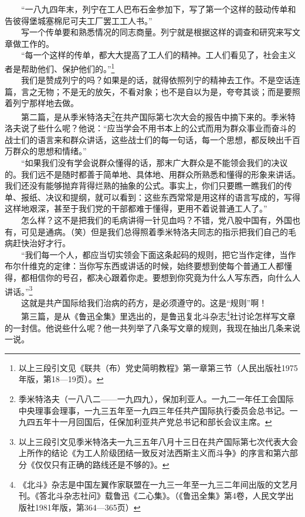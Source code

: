\documentclass[cn,11pt,chinese]{elegantbook}
\begin{document}
　　“一八九四年末，列宁在工人巴布石金参加下，写了第一个这样的鼓动传单和告彼得堡城塞棉尼可夫工厂罢工工人书。”\\
　　写一个传单要和熟悉情况的同志商量。列宁就是根据这样的调查和研究来写文章做工作的。\\
　　“每一个这样的传单，都大大提高了工人们的精神。工人们看见了，社会主义者是帮助他们、保护他们的。”\footnote[9]{ 以上三段引文见《联共（布）党史简明教程》第一章第三节（人民出版社1975年版，第18—19页）。}\\
　　我们是赞成列宁的吗？如果是的话，就得依照列宁的精神去工作。不是空话连篇，言之无物；不是无的放矢，不看对象；也不是自以为是，夸夸其谈；而是要照着列宁那样地去做。\\
　　第二篇，是从季米特洛夫\footnote[10]{ 季米特洛夫（一八八二——一九四九），保加利亚人。一九二一年任工会国际中央理事会理事，一九三五年至一九四三年任共产国际执行委员会总书记。一九四五年十一月回国后，任保加利亚共产党总书记和部长会议主席。}在共产国际第七次大会的报告中摘下来的。季米特洛夫说了些什么呢？他说：“应当学会不用书本上的公式而用为群众事业而奋斗的战士们的语言来和群众讲话，这些战士们的每一句话，每一个思想，都反映出千百万群众的思想和情绪。”\\
　　“如果我们没有学会说群众懂得的话，那末广大群众是不能领会我们的决议的。我们远不是随时都善于简单地、具体地、用群众所熟悉和懂得的形象来讲话。我们还没有能够抛弃背得烂熟的抽象的公式。事实上，你们只要瞧一瞧我们的传单、报纸、决议和提纲，就可以看到：这些东西常常是用这样的语言写成的，写得这样地艰深，甚至于我们党的干部都难于懂得，更用不着说普通工人了。”\\
　　怎么样？这不是把我们的毛病讲得一针见血吗？不错，党八股中国有，外国也有，可见是通病。（笑）但是我们总得照着季米特洛夫同志的指示把我们自己的毛病赶快治好才行。\\
　　“我们每一个人，都应当切实领会下面这条起码的规则，把它当作定律，当作布尔什维克的定律：当你写东西或讲话的时候，始终要想到使每个普通工人都懂得，都相信你的号召，都决心跟着你走。要想到你究竟为什么人写东西，向什么人讲话。”\footnote[11]{ 以上三段引文见季米特洛夫一九三五年八月十三日在共产国际第七次代表大会上所作的结论《为工人阶级团结一致反对法西斯主义而斗争》的序言和第六部分《仅仅只有正确的路线还是不够的》。}\\
　　这就是共产国际给我们治病的药方，是必须遵守的。这是“规则”啊！\\
　　第三篇，是从《鲁迅全集》里选出的，是鲁迅复北斗杂志\footnote[12]{ 《北斗》杂志是中国左翼作家联盟在一九三一年至一九三二年间出版的文艺月刊。《答北斗杂志社问》载鲁迅《二心集》。（《鲁迅全集》第4卷，人民文学出版社1981年版，第364—365页）}社讨论怎样写文章的一封信。他说些什么呢？他一共列举了八条写文章的规则，我现在抽出几条来说一说。\\
\end{document}
